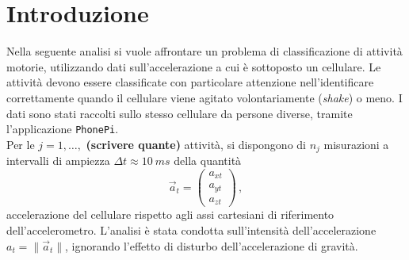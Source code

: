 \documentclass[./main.tex]{subfiles}
\begin{document}
\section{Introduzione}
Nella seguente analisi si vuole affrontare un problema di classificazione di attività motorie, utilizzando dati sull'accelerazione a cui è sottoposto un cellulare. Le attività devono essere classificate con particolare attenzione nell'identificare correttamente quando il cellulare viene agitato volontariamente ({\em shake}) o meno. I dati sono stati raccolti sullo stesso cellulare da persone diverse, tramite l'applicazione \texttt{PhonePi}\cite{kumar2019}.\\
Per le $j = 1, \ldots, $ \textbf{(scrivere quante)} attività, si dispongono di $n_j$ misurazioni a intervalli di ampiezza $\Delta t \approx \SI{10}{ms}$ della quantità
$$
\vec{a}_t = \begin{pmatrix}
a_{xt}\\
a_{yt}\\
a_{zt}
\end{pmatrix}\,,
$$
accelerazione del cellulare rispetto agli assi cartesiani di riferimento dell'accelerometro. L'analisi è stata condotta sull'intensità dell'accelerazione $a_t = \|\vec{a}_t\|$, ignorando l'effetto di disturbo dell'accelerazione di gravità.\\
\end{document}
